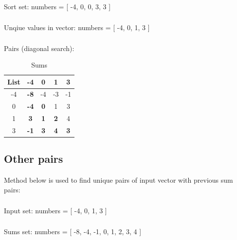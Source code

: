 \documentclass[a4paper,11pt]{article}
\begin{document}
    \subparagraph{} 
    Sort set:  
    numbers = [ -4, 0, 0, 3, 3 ] 
    
    \subparagraph{} 
    Unqiue values in vector:
    numbers = [ -4, 0, 1, 3 ]
    
    \subparagraph{} 
    Pairs (diagonal search): 

\vspace*{-1\baselineskip} %

\begin{table}[ht]
    \centering
    \caption {Sums}
    \begin{tabular}{c c c c c}
        \toprule
        \textbf{ List} & \tiny{-4} & \tiny{0}   & \tiny{1}  & \tiny{3} \\ 
        \midrule
        \tiny{-4}  &  \textbf{-8}  & {\footnotesize -4} &  {\footnotesize -3} & {\footnotesize-1 }  \\ 
        \tiny{0}   &  \textbf{-4}  & \textbf{0}  &  {\footnotesize 1}  &  {\footnotesize{3}  } \\ 
        \tiny{1}   &  \textbf{3 }  & \textbf{1}  &  \textbf{2}  &  {\footnotesize{4} }  \\ 
        \tiny{3}   &  \textbf{-1}  & \textbf{3}  &  \textbf{4}  &  \textbf{3}    \\ 
        \bottomrule
    \end{tabular}
\end{table}
    
    
    \newpage

    \noindent
    
    \subsection{Other pairs}

    \paragraph{} 
    
    Method below is used to find unique pairs of input vector with previous sum pairs:

    \subparagraph{} 
    Input set: numbers = [ -4, 0,  1, 3 ] 
    
    \subparagraph{} 
    Sums set: numbers = [ -8, -4, -1, 0, 1, 2, 3, 4 ] 
\end{document}

